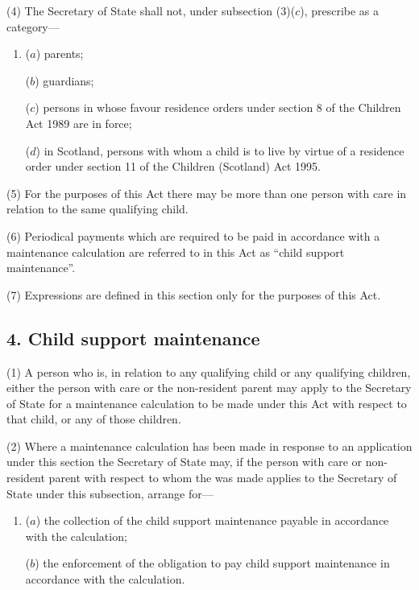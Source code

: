 \documentclass[a4paper]{article}
\begin{document}
(4)
The Secretary of State shall not, under subsection (3)($c$), prescribe as a
category---
\begin{enumerate}\item[]
($a$)
parents;

($b$)
guardians;

($c$)
persons in whose favour residence orders under section 8 of the Children
Act 1989
 are in force;

($d$)
in Scotland, persons 
with whom a child is to live by virtue of a residence order under section 11 of the Children (Scotland) Act 1995.
\end{enumerate}

(5)
For the purposes of this Act there may be more than one person with care
in relation to the same qualifying child.

(6)
Periodical payments which are required to be paid in accordance with a maintenance calculation
are referred to in this Act as “child
support maintenance”.

(7)
Expressions are defined in this section only for the purposes of this Act.


\subsection{4. Child support maintenance}

(1) A
person who is, in relation to any qualifying child or any qualifying
children, either the person with care or the non-resident parent
may
apply to the Secretary of State for a maintenance calculation
to be made under this Act with respect to that child, or any of those
children.

(2)
Where a maintenance calculation
has been made in
response to an application under this section the Secretary of State may, if the
person with care or non-resident parent
with respect to whom the
was made applies to the Secretary of State under this
subsection, arrange for---
\begin{enumerate}\item[]
($a$)
the collection of the child support maintenance payable in accordance
with the calculation;

($b$)
the enforcement of the obligation to pay child support maintenance in
accordance with the calculation.

\end{enumerate}
\end{document}

